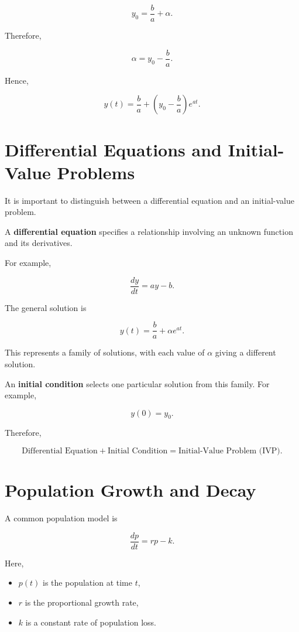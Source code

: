 \documentclass[11pt]{article}
\begin{document}
\[
y_0
=
\frac{b}{a}
+
\alpha.
\]

Therefore,

\[
\alpha
=
y_0-\frac{b}{a}.
\]

Hence,

\[
\boxed{
y(t)
=
\frac{b}{a}
+
\left(
y_0-\frac{b}{a}
\right)e^{at}
}.
\]

\section{Differential Equations and Initial-Value Problems}

It is important to distinguish between a differential equation and an
initial-value problem.

A \textbf{differential equation} specifies a relationship involving an
unknown function and its derivatives.

For example,

\[
\frac{dy}{dt}=ay-b.
\]

The general solution is

\[
y(t)
=
\frac{b}{a}
+
\alpha e^{at}.
\]

This represents a family of solutions, with each value of $\alpha$
giving a different solution.

An \textbf{initial condition} selects one particular solution from this
family. For example,

\[
y(0)=y_0.
\]

Therefore,

\[
\boxed{
\text{Differential Equation}
+
\text{Initial Condition}
=
\text{Initial-Value Problem (IVP)}
}.
\]

\section{Population Growth and Decay}

A common population model is

\[
\frac{dp}{dt}=rp-k.
\]

Here,

\begin{itemize}
    \item $p(t)$ is the population at time $t$,
    \item $r$ is the proportional growth rate,
    \item $k$ is a constant rate of population loss.
\end{itemize}
\end{document}
